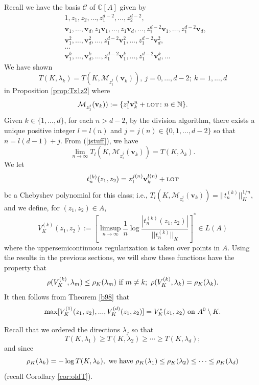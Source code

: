 \documentclass[12pt]{article}
\numberwithin{equation}{section}
\newcommand{\C}{\mathbb{C}}
\newcommand{\N}{\mathbb{N}}
\newcommand{\calC}{\mathcal{C}}
\newcommand{\calM}{\mathcal{M}}
\newcommand{\lot}{\text{\sc lot}}
\newcommand{\bv}{\mathbf{v}}
\begin{document}
Recall we have the basis $\calC$ of $\C[A]$ given by 
$$\begin{aligned}
&1,z_1,z_2,\ldots, z_1^{d-2},\ldots, z_2^{d-2},    \\
&\bv_1,\ldots,\bv_d, z_1\bv_1,\ldots,z_1\bv_d,\ldots, z_1^{d-2}\bv_1,\ldots,z_1^{d-2}\bv_d,\\ 
&\bv_1^2,\ldots,\bv_d^2,\ldots, z_1^{d-2}\bv_1^2,\ldots,z_1^{d-2}\bv_d^2,\\
&\ldots \\
&\bv_1^k,\ldots,\bv_d^k,\ldots, z_1^{d-2}\bv_1^k,\ldots,z_1^{d-2}\bv_d^k,\ldots 
\end{aligned}$$
We have shown 
\begin{equation} \label{jstuff} T(K,\lambda_k)=T(K, \calM_{z_1^j}(\bv_k)), \ j=0,...,d-2; \ k=1,...,d \end{equation}
in Proposition \ref{prop:Tz1z2} where
$$\calM_{z_1^j}(\bv_k)) :=\{ z_1^j\bv_k^n+\lot\colon n\in \N \}.$$
Given $k\in \{1,...,d\}$, for each $n>d-2$, by the division algorithm, there exists a unique positive integer $l=l(n)$ and $j=j(n)\in \{0,1,...,d-2\}$ so that  $n=l(d-1)+j$. From (\ref{jstuff}), we have  
$$\lim_{n\to \infty} T_l(K,\calM_{z_1^j}(\bv_k))=T(K,\lambda_k).$$
We let 
$$t_{n}^{(k)}(z_1,z_2)=z_1^{j(n)}\bv_k^{l(n)} + \lot$$
be a Chebyshev polynomial for this class; i.e., $T_l(K,\calM_{z_1^j}(\bv_k)) =||t_{n}^{(k)}||_K^{1/n}$, and we define, for $(z_1,z_2)\in A$,  
\begin{equation}\label{vkk} V_{K}^{(k)}(z_1,z_2):=[\limsup_{n\to \infty} \frac{1}{n}\log \frac{| t_{n}^{(k)}(z_1,z_2)|}{||t_n^{(k)}||_K}]^* \in L(A) \end{equation} 
where the uppersemicontinuous regularization is taken over points in $A$. Using the results in the previous sections, we will show these functions have the property that 
\begin{equation} \label{notildes} \rho(V_K^{(k)},\lambda_m)\leq \rho_K(\lambda_m) \ \hbox{if} \ m\not = k; \ \rho(V_K^{(k)},\lambda_k)=\rho_K(\lambda_k).\end{equation} 
It then follows from Theorem \ref{b98} that 
$$\max [V_{K}^{(1)}(z_1,z_2),...,V_{K}^{(d)}(z_1,z_2)]= V_K^*(z_1,z_2)  \ \hbox{on} \ A^0 \setminus K.$$



Recall that we ordered the directions $\lambda_j$ so that
$$T(K,\lambda_1) \geq T(K,\lambda_2) \geq \cdots \geq T(K,\lambda_d);$$
and since 
\begin{equation}\label{keyeq2} \rho_K(\lambda_k)= -\log T(K,\lambda_k), \ \hbox{we have} \ 
\rho_K(\lambda_1) \leq \rho_K(\lambda_2) \leq \cdots \leq \rho_K(\lambda_d)  \end{equation} 
(recall Corollary \ref{cor:oldT}).
\end{document}
